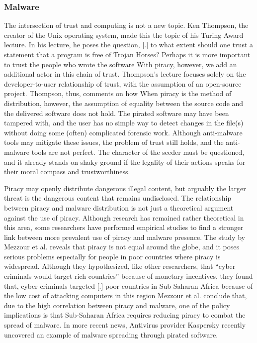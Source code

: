 \documentclass[onecolumn, 12pt]{article}
\begin{document}
\begin{refsection}
\subsubsection{Malware}
The intersection of trust and computing is not a new topic. Ken Thompson, the
creator of the Unix operating system, made this the topic of his Turing Award
lecture. In his lecture, he poses the question,
[.]{%
  to what extent should one trust a statement that
  a program is free of Trojan Horses? Perhaps it is more important to trust the
  people who wrote the software%
} With piracy, however, we add an additional actor in this chain of trust.
Thompson's lecture focuses solely on the developer-to-user relationship of
trust, with the assumption of an open-source project. Thompson, thus, comments
on how  When piracy is the method of distribution, however, the assumption of
equality between the source code and the delivered software does not hold. The
pirated software may have been tampered with, and the user has no simple way to
detect changes in the file(s) without doing some (often) complicated forensic
work. Although anti-malware tools may mitigate these issues, the problem of
trust still holds, and the anti-malware tools are not perfect. The character of
the seeder must be questioned, and it already stands on shaky ground if the
legality of their actions speaks for their moral compass and trustworthiness.

Piracy may openly distribute dangerous illegal content, but arguably the
larger threat is the dangerous content that remains undisclosed.
The relationship between piracy and malware distribution is not just a
theoretical argument against the use of piracy. Although research has remained
rather theoretical in this area, some researchers have performed empirical
studies to find a stronger link between more prevalent use of piracy and
malware presence. The study by Mezzour et al. reveals that piracy is not equal
around the globe, and it poses serious problems especially for people in
poor countries where piracy is widespread. Although they hypothesized, like
other researchers, that \enquote{cyber criminals would target rich countries}
because of monetary incentives, they found that, cyber criminals targeted
[.]{%
  poor countries in Sub-Saharan Africa because of the low cost of attacking
  computers in this region%
} Mezzour et al. conclude that, due to the high correlation between piracy
and malware, one of the policy implications is that Sub-Saharan Africa requires
reducing piracy to combat the spread of malware.
In more recent news, Antivirus provider Kaspersky recently uncovered an example
of malware spreading through pirated software.~\cite{pcmag:malware}


\end{refsection}
\end{document}
